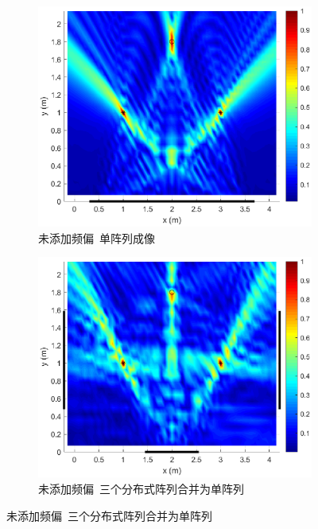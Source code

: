 \begin{figure}[H]
  \centering
  \begin{subfigure}[t]{.3\linewidth}
    \centering
    \includegraphics[width=1\textwidth]{figures/distribution/expected/array.eps}
    \caption{未添加频偏~单阵列成像}
  \end{subfigure}
  \begin{subfigure}[t]{.3\linewidth}
    \centering
    \includegraphics[width=1\textwidth]{figures/distribution/expected/joint.eps}
    \caption{未添加频偏~三个分布式阵列合并为单阵列}
  \end{subfigure}

\end{figure}

